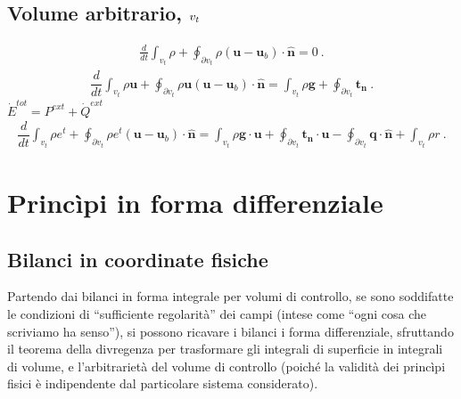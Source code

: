 \documentclass[letterpaper,10pt,english]{jupyterBook}
\begin{document}
\section{Volume arbitrario, \protect\(v_t\protect\)}
\label{\detokenize{ch/continuum/principles-integral-arbitrary:volume-arbitrario-v-t}}
\sphinxAtStartPar
{}
\begin{equation*}
\begin{split}\frac{d}{dt} \int_{v_t} \rho + \oint_{\partial v_t} \rho ( \mathbf{u} - \mathbf{u}_b ) \cdot \mathbf{\hat{n}} = 0 \ .\end{split}
\end{equation*}
\sphinxAtStartPar
{}
\begin{equation*}
\begin{split}\dfrac{d}{dt} \int_{v_t} \rho \mathbf{u} + \oint_{\partial v_t} \rho \mathbf{u} ( \mathbf{u} - \mathbf{u}_b ) \cdot \mathbf{\hat{n}} = \int_{v_t} \rho \mathbf{g} + \oint_{\partial v_t} \mathbf{t}_{\mathbf{n}} \ .\end{split}
\end{equation*}
\sphinxAtStartPar
{} \(\dot{E}^{tot} = P^{ext} + \dot{Q}^{ext}\)
\begin{equation*}
\begin{split}\dfrac{d}{dt} \int_{v_t} \rho e^t + \oint_{\partial v_t} \rho e^t ( \mathbf{u} - \mathbf{u}_b ) \cdot \mathbf{\hat{n}} = \int_{v_t} \rho \mathbf{g} \cdot \mathbf{u} + \oint_{\partial v_t} \mathbf{t}_{\mathbf{n}} \cdot \mathbf{u} - \oint_{\partial v_t} \mathbf{q} \cdot \mathbf{\hat{n}} + \int_{v_t} \rho r \ .\end{split}
\end{equation*}
\sphinxstepscope


\chapter{Princìpi in forma differenziale}
\label{\detokenize{ch/continuum/principles-differential:principi-in-forma-differenziale}}\label{\detokenize{ch/continuum/principles-differential:continuum-principles-differential}}\label{\detokenize{ch/continuum/principles-differential::doc}}

\section{Bilanci in coordinate fisiche}
\label{\detokenize{ch/continuum/principles-differential:bilanci-in-coordinate-fisiche}}
\sphinxAtStartPar
Partendo dai bilanci in forma integrale per volumi di controllo, se sono soddifatte le condizioni di “sufficiente regolarità” dei campi (intese come “ogni cosa che scriviamo ha senso”), si possono ricavare i bilanci i forma differenziale, sfruttando il teorema della divregenza per trasformare gli integrali di superficie in integrali di volume, e l’arbitrarietà del volume di controllo (poiché la validità dei princìpi fisici è indipendente dal particolare sistema considerato).
\end{document}
